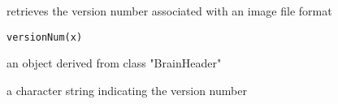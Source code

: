 \begin{Description}\relax
retrieves the version number associated with an image file format
\end{Description}
\begin{Usage}
\begin{verbatim}
versionNum(x)
\end{verbatim}
\end{Usage}
\begin{Arguments}
\begin{ldescription}
\item[\code{x}] an object derived from class "BrainHeader" 
\end{ldescription}
\end{Arguments}
\begin{Value}
a character string indicating the version number
\end{Value}

